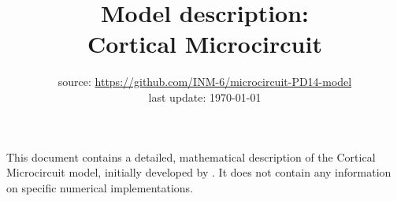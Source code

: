 \documentclass[10pt,a4paper,twoside,american]{article}
\theoremstyle{definitionstyle}
\begin{document}
\title{Model description:\\ \textbf{Cortical Microcircuit} \citep{Potjans14}}
\author{}
\date{%
  source: \href{https://github.com/INM-6/microcircuit-PD14-model}{https://github.com/INM-6/microcircuit-PD14-model}\\[1ex]
  last update: \today\\
}
\maketitle
\thispagestyle{empty}
\noindent
This document contains a detailed, mathematical description of the Cortical Microcircuit model, initially developed by \citet{Potjans14}.
It does not contain any information on specific numerical implementations.

\def\marg{1ex}
\setlength{\parindent}{0pt}

\tableofcontents
\clearpage
\end{document}
